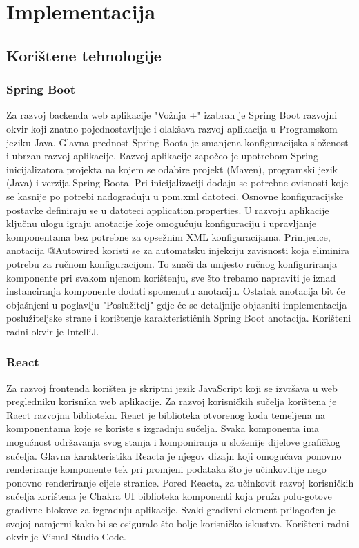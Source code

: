 \chapter{Implementacija}
\section{Korištene tehnologije}

\subsection{Spring Boot}
Za razvoj backenda web aplikacije "Vožnja +" izabran je Spring Boot razvojni okvir koji znatno pojednostavljuje i olakšava razvoj aplikacija u Programskom jeziku Java. Glavna prednost Spring Boota je smanjena konfiguracijska složenost i ubrzan razvoj aplikacije. Razvoj aplikacije započeo je upotrebom Spring inicijalizatora projekta na kojem se odabire projekt (Maven), programski jezik (Java) i verzija Spring Boota. Pri inicijalizaciji dodaju se potrebne ovisnosti koje se kasnije po potrebi nadograđuju u pom.xml datoteci. Osnovne konfiguracijske postavke definiraju se u datoteci application.properties.  U razvoju aplikacije ključnu ulogu igraju anotacije koje omogućuju konfiguraciju i upravljanje komponentama bez potrebne za opsežnim XML konfiguracijama. Primjerice, anotacija @Autowired koristi se za automatsku injekciju zavisnosti koja eliminira potrebu za ručnom konfiguracijom. To znači da umjesto ručnog konfiguriranja komponente pri svakom njenom korištenju, sve što trebamo napraviti je iznad instanciranja komponente dodati spomenutu anotaciju. Ostatak anotacija bit će objašnjeni u poglavlju "Poslužitelj" gdje će se detaljnije objasniti  implementacija poslužiteljske strane i korištenje karakterističnih Spring Boot anotacija. Korišteni radni okvir je IntelliJ.
\subsection{React}
Za razvoj frontenda korišten je skriptni jezik JavaScript koji se izvršava u web pregledniku korisnika web aplikacije. Za razvoj korisničkih sučelja korištena je Raect razvojna biblioteka. React je biblioteka otvorenog koda temeljena na komponentama koje se koriste s izgradnju sučelja. Svaka komponenta ima mogućnost održavanja svog stanja i komponiranja u složenije dijelove grafičkog sučelja. Glavna karakteristika Reacta je njegov dizajn koji omogućava ponovno renderiranje komponente tek pri promjeni podataka što je učinkovitije nego ponovno renderiranje cijele stranice. Pored Reacta, za učinkovit razvoj korisničkih sučelja korištena je  Chakra UI biblioteka komponenti koja pruža polu-gotove gradivne blokove za izgradnju aplikacije. Svaki gradivni element prilagođen je svojoj namjerni kako bi se osiguralo što bolje korisničko iskustvo. Korišteni radni okvir je Visual Studio Code.

